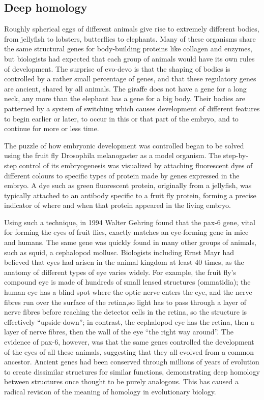 \hypertarget{deep-homology}{%
\subsection{Deep homology}\label{deep-homology}}

Roughly spherical eggs of different animals give rise to extremely different bodies, from jellyfish to lobsters, butterflies to elephants. Many of these organisms share the same structural genes for body-building proteins like collagen and enzymes, but biologists had expected that each group of animals would have its own rules of development. The surprise of evo-devo is that the shaping of bodies is controlled by a rather small percentage of genes, and that these regulatory genes are ancient, shared by all animals. The giraffe does not have a gene for a long neck, any more than the elephant has a gene for a big body. Their bodies are patterned by a system of switching which causes development of different features to begin earlier or later, to occur in this or that part of the embryo, and to continue for more or less time.

The puzzle of how embryonic development was controlled began to be solved using the fruit fly Drosophila melanogaster as a model organism. The step-by-step control of its embryogenesis was visualized by attaching fluorescent dyes of different colours to specific types of protein made by genes expressed in the embryo. A dye such as green fluorescent protein, originally from a jellyfish, was typically attached to an antibody specific to a fruit fly protein, forming a precise indicator of where and when that protein appeared in the living embryo.

Using such a technique, in 1994 Walter Gehring found that the pax-6 gene, vital for forming the eyes of fruit flies, exactly matches an eye-forming gene in mice and humans. The same gene was quickly found in many other groups of animals, such as squid, a cephalopod mollusc. Biologists including Ernst Mayr had believed that eyes had arisen in the animal kingdom at least 40 times, as the anatomy of different types of eye varies widely. For example, the fruit fly's compound eye is made of hundreds of small lensed structures (ommatidia); the human eye has a blind spot where the optic nerve enters the eye, and the nerve fibres run over the surface of the retina,so light has to pass through a layer of nerve fibres before reaching the detector cells in the retina, so the structure is effectively ``upside-down''; in contrast, the cephalopod eye has the retina, then a layer of nerve fibres, then the wall of the eye ``the right way around''. The evidence of pax-6, however, was that the same genes controlled the development of the eyes of all these animals, suggesting that they all evolved from a common ancestor. Ancient genes had been conserved through millions of years of evolution to create dissimilar structures for similar functions, demonstrating deep homology between structures once thought to be purely analogous. This has caused a radical revision of the meaning of homology in evolutionary biology.

